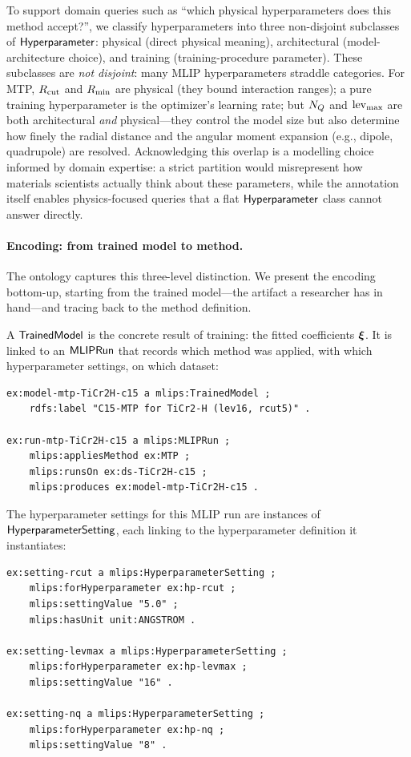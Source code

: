 To support domain queries such as ``which physical hyperparameters
does this method accept?'', we classify hyperparameters into three
non-disjoint subclasses of $\mathsf{Hyperparameter}$: physical (direct physical
meaning), architectural (model-architecture choice), and training
(training-procedure parameter).
These subclasses are \emph{not disjoint}: many MLIP hyperparameters
straddle categories. For MTP, $R_{\mathrm{cut}}$ and $R_{\mathrm{min}}$ are physical (they bound
interaction ranges); a pure training hyperparameter is the optimizer's
learning rate; but $N_Q$ and $\operatorname{lev}_{\mathrm{max}}$ are both architectural
\emph{and} physical---they control the model size but also determine how
finely the radial distance and the angular moment expansion (e.g., dipole,
quadrupole) are resolved. Acknowledging this overlap is a modelling choice
informed by domain expertise: a strict partition would misrepresent how
materials scientists actually think about these parameters, while the
annotation itself enables physics-focused queries that a flat
$\mathsf{Hyperparameter}$ class cannot answer directly.

\paragraph{Encoding: from trained model to method.}
The ontology captures this three-level distinction.
We present the encoding bottom-up, starting from the trained model---the
artifact a researcher has in hand---and tracing back to the method
definition.

A $\mathsf{TrainedModel}$ is the concrete result of training: the fitted
coefficients $\boldsymbol{\xi}$. It is linked to an $\mathsf{MLIPRun}$ that
records which method was applied, with which hyperparameter settings,
on which dataset:
%
\begin{lstlisting}[language=turtle,caption={A trained model and its MLIP run.},label=lst:trained-model]
ex:model-mtp-TiCr2H-c15 a mlips:TrainedModel ;
    rdfs:label "C15-MTP for TiCr2-H (lev16, rcut5)" .

ex:run-mtp-TiCr2H-c15 a mlips:MLIPRun ;
    mlips:appliesMethod ex:MTP ;
    mlips:runsOn ex:ds-TiCr2H-c15 ;
    mlips:produces ex:model-mtp-TiCr2H-c15 .
\end{lstlisting}

\noindent
The hyperparameter settings for this MLIP run are instances of
$\mathsf{HyperparameterSetting}$, each linking to the hyperparameter
definition it instantiates:
%
\begin{lstlisting}[language=turtle,caption={Hyperparameter settings for a specific MLIP run.},label=lst:hp-settings]
ex:setting-rcut a mlips:HyperparameterSetting ;
    mlips:forHyperparameter ex:hp-rcut ;
    mlips:settingValue "5.0" ;
    mlips:hasUnit unit:ANGSTROM .

ex:setting-levmax a mlips:HyperparameterSetting ;
    mlips:forHyperparameter ex:hp-levmax ;
    mlips:settingValue "16" .

ex:setting-nq a mlips:HyperparameterSetting ;
    mlips:forHyperparameter ex:hp-nq ;
    mlips:settingValue "8" .
\end{lstlisting}

